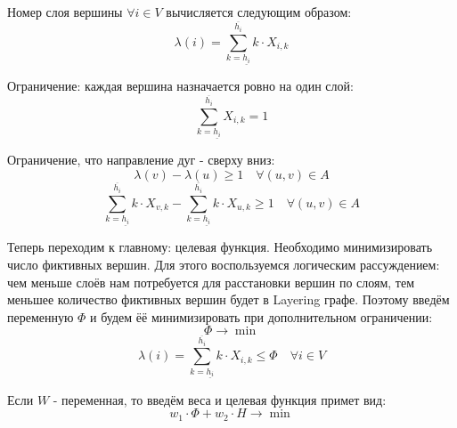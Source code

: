 \documentclass[%
10pt, %
final, %
oneside, %
onecolumn, %
centertags]{article} %
\theoremstyle{plain}
\theoremstyle{definition}
\theoremstyle{remark}
\begin{document}
Номер слоя вершины $\forall i \in V$ вычисляется следующим образом:
$$\lambda(i) = \sum\limits_{k = \underline{h_i}}^{\overline{h_i}} k \cdot X_{i, k}$$

Ограничение: каждая вершина назначается ровно на один слой:
$$\sum\limits_{k = \underline{h_i}}^{\overline{h_i}} X_{i, k} = 1$$

Ограничение, что направление дуг - сверху вниз:
$$\lambda(v) - \lambda(u) \geqslant 1 \quad \forall (u,v) \in A$$
$$\sum\limits_{k = \underline{h_i}}^{\overline{h_i}} k \cdot X_{v, k} - \sum\limits_{k = \underline{h_i}}^{\overline{h_i}} k \cdot X_{u, k} \geqslant 1 \quad \forall (u,v) \in A$$

Теперь переходим к главному: целевая функция. Необходимо минимизировать число фиктивных вершин. Для этого воспользуемся логическим рассуждением: чем меньше слоёв нам потребуется для расстановки вершин по слоям, тем меньшее количество фиктивных вершин будет в Layering графе. Поэтому введём переменную $\Phi$ и будем ёё минимизировать при дополнительном ограничении:
$$\Phi \to \min$$
$$\lambda(i) = \sum\limits_{k = \underline{h_i}}^{\overline{h_i}} k \cdot X_{i, k} \leqslant \Phi \quad \forall i \in V$$

Если $W$ - переменная, то введём веса и целевая функция примет вид:
$$w_1 \cdot \Phi + w_2 \cdot H \to \min$$
\end{document}
